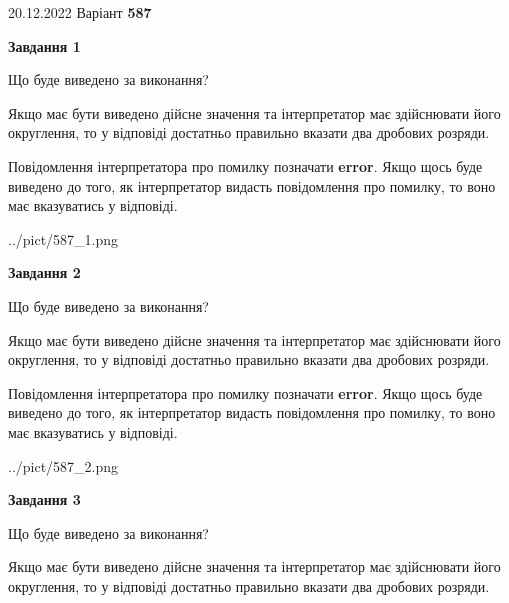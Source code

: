\documentclass[12pt, ukrainian]{article}
\begin{document}
{20.12.2022 Варіант \No \textbf { 587 }\par}
{
\begin {Large}

{\begin {center}\textbf{Завдання 1}\end {center}}\par
Що буде виведено за виконання? \par

Якщо має бути виведено дійсне значення та інтерпретатор має здійснювати його округлення, 
то у відповіді достатньо правильно вказати два дробових розряди.

Повідомлення інтерпретатора про помилку позначати \textbf{error}.
Якщо щось буде виведено до того, як інтерпретатор видасть повідомлення про помилку, 
то воно має вказуватись у відповіді. \par

\begin{center}
	{../pict/587_1.png}
\end{center}
\newpage

{\begin {center}\textbf{Завдання 2}\end {center}}\par
Що буде виведено за виконання? \par

Якщо має бути виведено дійсне значення та інтерпретатор має здійснювати його округлення, 
то у відповіді достатньо правильно вказати два дробових розряди.

Повідомлення інтерпретатора про помилку позначати \textbf{error}.
Якщо щось буде виведено до того, як інтерпретатор видасть повідомлення про помилку, 
то воно має вказуватись у відповіді. \par

\begin{center}
	{../pict/587_2.png}
\end{center}
\newpage

{\begin {center}\textbf{Завдання 3}\end {center}}\par
Що буде виведено за виконання? \par

Якщо має бути виведено дійсне значення та інтерпретатор має здійснювати його округлення, 
то у відповіді достатньо правильно вказати два дробових розряди.


\end{Large}}
\end{document}
